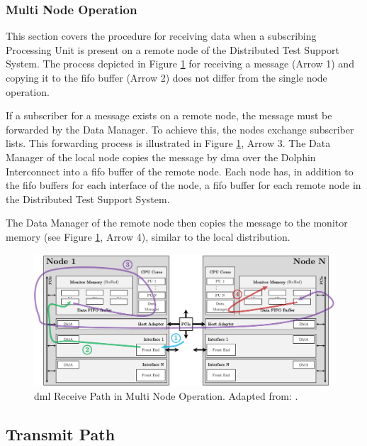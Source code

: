 \subsubsection{Multi Node Operation}
This section covers the procedure for receiving data when a subscribing Processing Unit is present on a remote node of the Distributed Test Support System. The process depicted in Figure \ref{fig:DmlRecMultiNode} for receiving a message (Arrow 1) and copying it to the \ac{fifo} buffer (Arrow 2) does not differ from the single node operation.

If a subscriber for a message exists on a remote node, the message must be forwarded by the Data Manager. To achieve this, the nodes exchange subscriber lists. This forwarding process is illustrated in Figure \ref{fig:DmlRecMultiNode}, Arrow 3. The Data Manager of the local node copies the message by \ac{dma} over the Dolphin Interconnect into a \ac{fifo} buffer of the remote node. Each node has, in addition to the \ac{fifo} buffers for each interface of the node, a \ac{fifo} buffer for each remote node in the Distributed Test Support System.

The Data Manager of the remote node then copies the message to the monitor memory (see Figure \ref{fig:DmlRecMultiNode}, Arrow 4), similar to the local distribution. \\

\begin{figure}[h!]
    \centering
    \includegraphics[width=\linewidth]{figures/dml/dml02b.pdf}
    \caption[DML Receive Path in Multi Node Operation]{\ac{dml} Receive Path in Multi Node Operation. Adapted from: \cite{dml01}.}
    \label{fig:DmlRecMultiNode}
\end{figure}



\subsection{Transmit Path}

